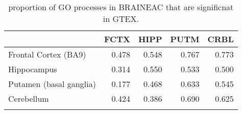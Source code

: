 \begin{longtable}{lrrrr}
  \hline
 & FCTX & HIPP & PUTM & CRBL \\ 
  \hline
Frontal Cortex (BA9) & 0.478 & 0.548 & 0.767 & 0.773 \\ 
  Hippocampus & 0.314 & 0.550 & 0.533 & 0.500 \\ 
  Putamen (basal ganglia) & 0.177 & 0.468 & 0.633 & 0.545 \\ 
  Cerebellum & 0.424 & 0.386 & 0.690 & 0.625 \\ 
   \hline
\hline
\caption{proportion of GO processes in BRAINEAC that are significnat in GTEX.} 
\label{Goprop}
\end{longtable}
